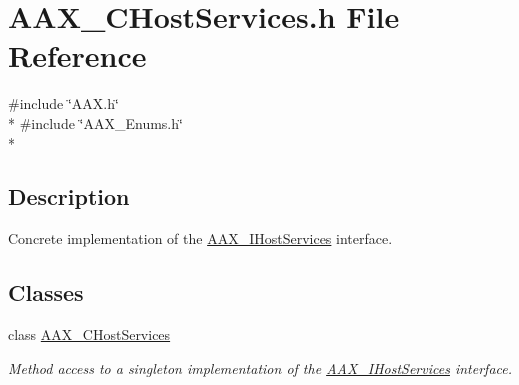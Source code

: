 \hypertarget{a00174}{}\section{A\+A\+X\+\_\+\+C\+Host\+Services.\+h File Reference}
\label{a00174}
{\ttfamily \#include \char`\"{}A\+A\+X.\+h\char`\"{}}\\*
{\ttfamily \#include \char`\"{}A\+A\+X\+\_\+\+Enums.\+h\char`\"{}}\\*


\subsection{Description}
Concrete implementation of the \hyperlink{a00103}{A\+A\+X\+\_\+\+I\+Host\+Services} interface. 

\subsection*{Classes}
\begin{DoxyCompactItemize}
\item 
class \hyperlink{a00021}{A\+A\+X\+\_\+\+C\+Host\+Services}
\begin{DoxyCompactList}\small\item\em Method access to a singleton implementation of the \hyperlink{a00103}{A\+A\+X\+\_\+\+I\+Host\+Services} interface. \end{DoxyCompactList}\end{DoxyCompactItemize}
